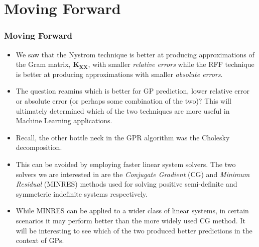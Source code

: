 \documentclass[9pt,hyperref={pdfpagelabels=false},xcolor=table]{beamer}
\begin{document}
\section{Moving Forward}

\begin{frame}
    \frametitle{Moving Forward}
    \begin{itemize}
        \item We saw that the Nystrom technique is better at producing approximations of the Gram matrix, $\bm{K}_{\bm{XX}}$, with smaller {\it relative errors} while the RFF technique is better at producing approximations with smaller {\it absolute errors}.
        \item The question reamins which is better for GP prediction, lower relative error or absolute error (or perhaps some combination of the two)? This will ultimately determined which of the two techniques are more useful in Machine Learning applications.
        \item Recall, the other bottle neck in the GPR algorithm was the Cholesky decomposition.
        \item This can be avoided by employing faster linear system solvers. The two solvers we are interested in are the {\it Conjugate Gradient} (CG) and {\it Minimum Residual} (MINRES) methods used for solving positive semi-definite and symmeteric indefinite systems respectively.
        \item While MINRES can be applied to a wider class of linear systems, in certain scenarios it may perform better than the more widely used CG method. It will be interesting to see which of the two produced better predictions in the context of GPs.
    \end{itemize}
\end{frame}
\end{document}
